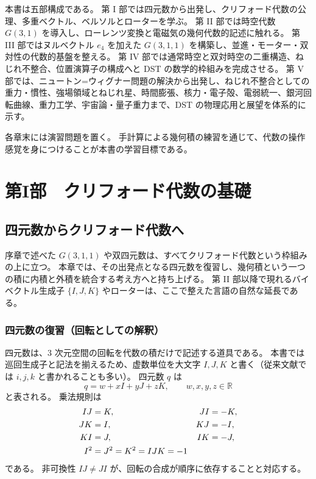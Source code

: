 \documentclass[dvipdfmx,a4paper,oneside]{jsbook}
\numberwithin{equation}{chapter}
\begin{document}
本書は五部構成である。
第 I 部では四元数から出発し、クリフォード代数の公理、多重ベクトル、ベルソルとローターを学ぶ。
第 II 部では時空代数 \(G(3,1)\) を導入し、ローレンツ変換と電磁気の幾何代数的記述に触れる。
第 III 部ではヌルベクトル \(e_4\) を加えた \(G(3,1,1)\) を構築し、並進・モーター・双対性の代数的基盤を整える。
第 IV 部では通常時空と双対時空の二重構造、ねじれ不整合、位置演算子の構成へと DST の数学的枠組みを完成させる。
第 V 部では、ニュートン=ウィグナー問題の解決から出発し、ねじれ不整合としての重力・慣性、強場領域とねじれ星、時間膨張、核力・電子殻、電弱統一、銀河回転曲線、重力工学、宇宙論・量子重力まで、DST の物理応用と展望を体系的に示す。

各章末には演習問題を置く。
手計算による幾何積の練習を通じて、代数の操作感覚を身につけることが本書の学習目標である。

\newpage

\part{第I部　クリフォード代数の基礎}

\chapter{四元数からクリフォード代数へ}

序章で述べた \(G(3,1,1)\) や双四元数は、すべてクリフォード代数という枠組みの上に立つ。
本章では、その出発点となる四元数を復習し、幾何積という一つの積に内積と外積を統合する考え方へと持ち上げる。
第 II 部以降で現れるバイベクトル生成子 \(\{I,J,K\}\) やローターは、ここで整えた言語の自然な延長である。

\section{四元数の復習（回転としての解釈）}

四元数は、3 次元空間の回転を代数の積だけで記述する道具である。
本書では巡回生成子と記法を揃えるため、虚数単位を大文字 \(I,J,K\) と書く（従来文献では \(i,j,k\) と書かれることも多い）。
四元数 \(q\) は
\begin{equation}
  q = w + xI + yJ + zK, \qquad w,x,y,z \in \mathbb{R}
\end{equation}
と表される。
乗法規則は
\begin{align}
  IJ &= K, & JI &= -K, \notag \\
  JK &= I, & KJ &= -I, \notag \\
  KI &= J, & IK &= -J, \notag \\
  I^2 &= J^2 = K^2 = IJK = -1
  \label{eq:quat-mult}
\end{align}
である。
非可換性 \(IJ \neq JI\) が、回転の合成が順序に依存することと対応する。
\end{document}

